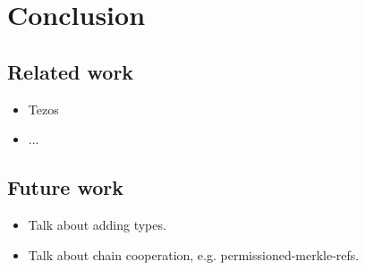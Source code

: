 \section{Conclusion}

\subsection{Related work}

\begin{itemize}
  \item Tezos
  \item ...
\end{itemize}

\subsection{Future work}

\begin{itemize}
  \item Talk about adding types.
  \item Talk about chain cooperation, e.g. permissioned-merkle-refs.
\end{itemize}